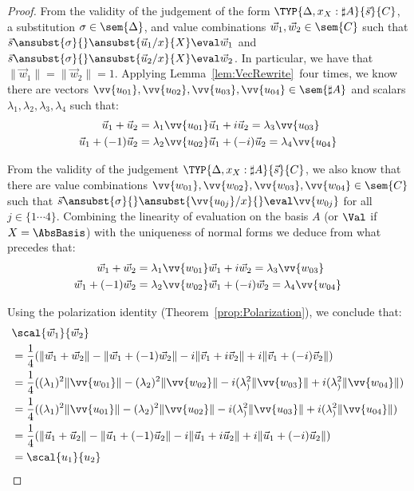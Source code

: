 \begin{proof}
    From the validity of the judgement of the form $\TYP{\Delta, x_X:\sharp A}{\vec{s}}{C}$, a substitution $\sigma\in\sem{\Delta}$, and value combinations $\vec{w}_{1},\vec{w}_{2}\in\sem{C}$ such that $\vec{s}\ansubst{\sigma}{}\ansubst{\vec{u}_{1}/x}{X}\eval\vec{w}_{1}$ and $\vec{s}\ansubst{\sigma}{}\ansubst{\vec{u}_{2}/x}{X}\eval\vec{w}_{2}$. In particular, we have that $\|\vec{w}_{1}\| = \|\vec{w}_{2}\|=1$. Applying Lemma~\ref{lem:VecRewrite}~four times, we know there are vectors $\vv{u_{01}},\vv{u_{02}},\vv{u_{03}},\vv{u_{04}}\in\sem{\sharp A}$ and scalars $\lambda_1,\lambda_2,\lambda_3,\lambda_4$ such that:
    \begin{align*}
        \vec{u}_{1} + \vec{u}_{2} = \lambda_1 \vv{u_{01}} & \vec{u}_{1} + i \vec{u}_{2} = \lambda_3 \vv{u_{03}} \\
        \vec{u}_{1} + (-1) \vec{u}_{2} = \lambda_2 \vv{u_{02}} & \vec{u}_{1} + (-i) \vec{u}_{2} = \lambda_4 \vv{u_{04}} 
    \end{align*}

    From the validity of the judgement $\TYP{\Delta, x_X:\sharp A}{\vec{s}}{C}$, we also know that there are value combinations $\vv{w_{01}},\vv{w_{02}},\vv{w_{03}},\vv{w_{04}}\in\sem{C}$ such that $\vec{s}\ansubst{\sigma}{}\ansubst{\vv{u_{0j}}/x}{}\eval\vv{w_{0j}}$ for all $j\in\{1\dotsb 4\}$. Combining the linearity of evaluation on the basis $A$ (or $\Val$ if $X=\AbsBasis$) with the uniqueness of normal forms we deduce from what precedes that:
    \begin{align*}
        \vec{w}_{1} + \vec{w}_{2} = \lambda_1 \vv{w_{01}} & \vec{w}_{1} + i \vec{w}_{2} = \lambda_3 \vv{w_{03}} \\
        \vec{w}_{1} + (-1) \vec{w}_{2} = \lambda_2 \vv{w_{02}} & \vec{w}_{1} + (-i) \vec{w}_{2} = \lambda_4 \vv{w_{04}} 
    \end{align*}

    Using the polarization identity (Theorem~\ref{prop:Polarization}), we conclude that:
    \begin{align*}
        &\scal{\vec{w}_{1}}{\vec{w}_{2}}\\
        &= \frac{1}{4}(\|\vec{w}_{1}+\vec{w}_{2}\| - \|\vec{w}_{1} + (-1)\vec{w}_{2}\| - i \|\vec{v}_{1} + i \vec{v}_{2}\| + i \|\vec{v}_{1} + (-i) \vec{v}_{2}\|)\\
        &= \frac{1}{4}((\lambda_1)^2\|\vv{w_{01}}\| - (\lambda_2)^2\|\vv{w_{02}}\| - i (\lambda_)^2 \|\vv{w_{03}}\| + i (\lambda_)^2\|\vv{w_{04}}\|)\\
        &= \frac{1}{4}((\lambda_1)^2\|\vv{u_{01}}\| - (\lambda_2)^2\|\vv{u_{02}}\| - i (\lambda_)^2 \|\vv{u_{03}}\| + i (\lambda_)^2\|\vv{u_{04}}\|)\\
        &= \frac{1}{4}(\|\vec{u}_{1}+\vec{u}_{2}\| - \|\vec{u}_{1} + (-1)\vec{u}_{2}\| - i \|\vec{u}_{1} + i \vec{u}_{2}\| + i \|\vec{u}_{1} + (-i) \vec{u}_{2}\|)\\
        &=\scal{u_1}{u_2}
	\tag*{\qedhere}
    \end{align*}
\end{proof}

